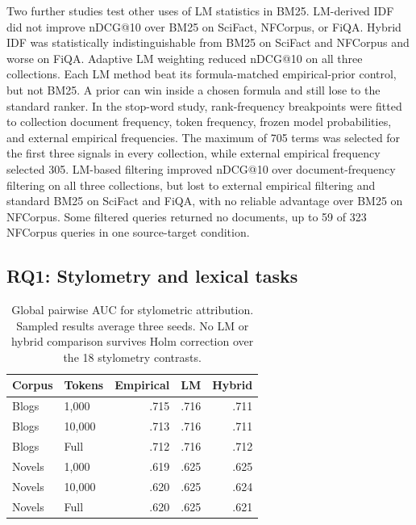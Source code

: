\documentclass[11pt]{article}
\begin{document}
Two further studies test other uses of LM statistics in BM25. LM-derived IDF
did not improve nDCG@10 over BM25 on SciFact, NFCorpus, or FiQA. Hybrid IDF was
statistically indistinguishable from BM25 on SciFact and NFCorpus and worse on
FiQA. Adaptive LM weighting reduced nDCG@10 on all three collections. Each LM
method beat its formula-matched empirical-prior control, but not BM25. A prior
can win inside a chosen formula and still lose to the standard ranker. In the
stop-word study, rank-frequency breakpoints were fitted to collection document
frequency, token frequency, frozen model probabilities, and external empirical
frequencies. The maximum of 705 terms was selected for the first three signals
in every collection, while external empirical frequency selected 305. LM-based
filtering improved nDCG@10 over document-frequency filtering on all three
collections, but lost to external empirical filtering and standard BM25 on
SciFact and FiQA, with no reliable advantage over BM25 on NFCorpus. Some
filtered queries returned no documents, up to 59 of 323 NFCorpus queries in
one source-target condition.

\subsection{RQ1: Stylometry and lexical tasks}

\begin{table}[t]
\centering
\small
\begin{tabular}{llrrr}
\toprule
Corpus & Tokens & Empirical & LM & Hybrid \\
\midrule
Blogs & 1,000 & .715 & .716 & .711 \\
Blogs & 10,000 & .713 & .716 & .711 \\
Blogs & Full & .712 & .716 & .712 \\
Novels & 1,000 & .619 & .625 & .625 \\
Novels & 10,000 & .620 & .625 & .624 \\
Novels & Full & .620 & .625 & .621 \\
\bottomrule
\end{tabular}
\caption{Global pairwise AUC for stylometric attribution. Sampled results
average three seeds. No LM or hybrid comparison survives Holm correction
over the 18 stylometry contrasts.}
\label{tab:stylometry}
\end{table}
\end{document}
